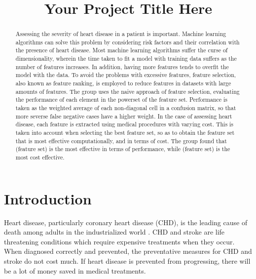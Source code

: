 \documentclass[conference]{IEEEtran}
\begin{document}
\title{Your Project Title Here}

\author{
}

\maketitle

\begin{abstract}
	Assessing the severity of heart disease in a patient is important.
	Machine learning algorithms can solve this problem by considering risk factors and their correlation with the presence of heart disease.
	Most machine learning algorithms suffer the curse of dimensionality, wherein the time taken to fit a model with training data suffers as the number of features increases.
	In addition, having more features tends to overfit the model with the data.
	To avoid the problems with excessive features, feature selection, also known as feature ranking, is employed to reduce features in datasets with large amounts of features.
	The group uses the naive approach of feature selection, evaluating the performance of each element in the powerset of the feature set.
	Performance is taken as the weighted average of each non-diagonal cell in a confusion matrix, so that more severse false negative cases have a higher weight.
	In the case of assessing heart disease, each feature is extracted using medical procedures with varying cost.
	This is taken into account when selecting the best feature set, so as to obtain the feature set that is most effective computationally, and in terms of cost.
	The group found that (feature set) is the most effective in terms of performance, while (feature set) is the most cost effective.
\end{abstract}

\section{Introduction}
	Heart disease, particularly coronary heart disease (CHD), is the leading cause of death among adults in the industrialized world \cite{bib:stroke_stat}.
	CHD and stroke are life threatening conditions which require expensive treatments when they occur.
	When diagnosed correctly and prevented, the preventative measures for CHD and stroke do not cost much.
	If heart disease is prevented from progressing, there will be a lot of money saved in medical treatments.
\end{document}
